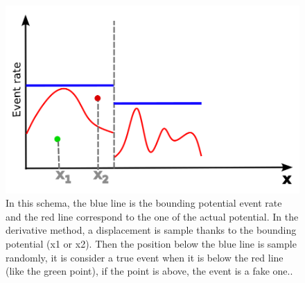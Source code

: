 \documentclass[jcp,twocolumn,longbibliography,superscriptaddress]{revtex4-2}
\begin{document}
	\begin{figure}[h!]
		\centering
		\includegraphics[width=0.9\columnwidth]{./Figures/DerivativeMethod.png}
		\caption{In this schema, the blue line is the bounding potential event rate and the red line correspond to the one of the actual potential. In the derivative method, a displacement is sample thanks to the bounding potential (x1 or x2). Then the position below the blue line is sample randomly, it is consider a true event when it is below the red line (like the green point), if the point is above, the event is a fake one..}
		\label{derivativeMethod}
	\end{figure}
	
\end{document}
